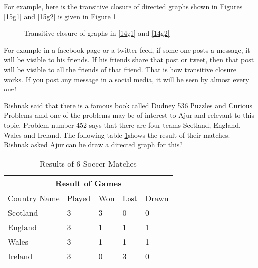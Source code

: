 For example, here is the transitive closure of directed graphs shown in Figures \ref{15g1} and \ref{15g2} is given in Figure \ref{15g4}

\begin{figure}
\begin{center}
\caption{ Transitive closure of graphs in \ref{14g1} and \ref{14g2}}\label{15g4}
\end{center}
\end{figure}

For example in a facebook page or a twitter feed, if some one posts a message, it will be visible to his friends. If his friends share that post or tweet, then that post will be visible to all the friends of that friend. That is how transitive closure works. If you post any message in a social media, it will be seen
by almost every one!


Rishnak said that there is a famous book called Dudney 536 Puzzles and Curious Problems amd one of the problems may be of interest to Ajur and relevant to this topic. Problem number 452 says that there are four teams Scotland, England, Wales and Ireland. The following table \ref {14t1}shows the result of their matches. Rishnak asked Ajur can he draw a directed graph for this? 
\begin{table}
\begin{center}
\begin{tabular}{ |p{3cm}||p{1.5cm}||p{1.5cm}||p{1.5cm}||p{1.5cm}||  }
 \hline
 \multicolumn{5}{|c|}{Result of Games} \\
 \hline
 Country Name & Played &Won&Lost&Drawn\\
 \hline
 Scotland  & 3    &3&0&0\\
 England& 3& 1 &1&1\\
 Wales&3 &1&1&1\\
 Ireland    &3 &0&3&0\\
 
 \hline
\end{tabular}
\caption{Results of 6 Soccer Matches}\label{14t1}
\end{center}
\end{table}


